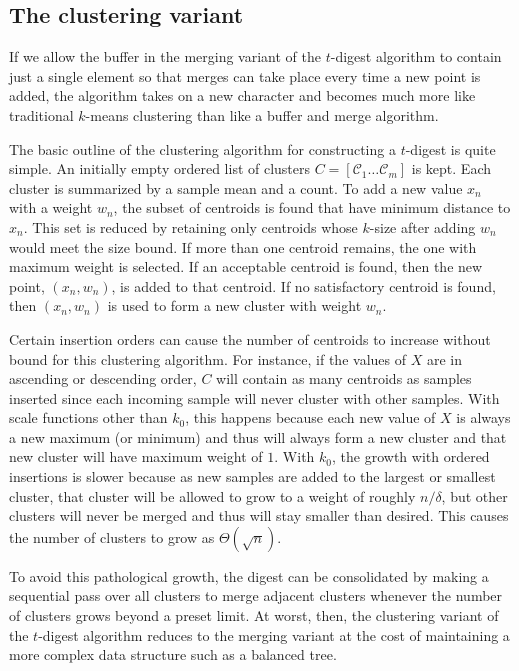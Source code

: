 \documentclass{vldb}
\begin{document}
\subsection{The clustering variant}
If we allow the buffer in the merging variant of the $t$-digest algorithm to contain just a single element so that merges can take place every time a new point is added, the algorithm takes on a new character and becomes much more like traditional $k$-means clustering than like a buffer and merge algorithm.

The basic outline of the clustering algorithm for constructing a $t$-digest is quite simple.  An initially empty ordered list of clusters $C = [ \mathcal C_1 \ldots \mathcal C_m ]$ is kept.  Each cluster is summarized by a sample mean and a count.  To add a new value $x_n$ with a weight $w_n$, the subset of centroids is found that have minimum distance to $x_n$.  This set is reduced by retaining only centroids whose $k$-size after adding $w_n$ would meet the size bound.  If more than one centroid remains, the one with maximum weight is selected.  If an acceptable centroid is found, then the new point, $(x_n,w_n)$, is added to that centroid. If no satisfactory centroid is found, then $(x_n,w_n)$ is used to form a new cluster with weight $w_n$.

Certain insertion orders can cause the number of centroids to increase without bound for this clustering algorithm. For instance, if the values of $X$ are in ascending or descending order, $C$ will contain as many centroids as samples inserted since each incoming sample will never cluster with other samples.  With scale functions other than $k_0$, this happens because each new value of $X$ is always a new maximum (or minimum) and thus will always form a new cluster and that new cluster will have maximum weight of $1$.  With $k_0$, the growth with ordered insertions is slower because as new samples are added to the largest or smallest cluster, that cluster will be allowed to grow to a weight of roughly $n/\delta$, but other clusters will never be merged and thus will stay smaller than desired. This causes the number of clusters to grow as $\Theta(\sqrt n )$. 

To avoid this pathological growth, the digest can be consolidated by making a sequential pass over all clusters to merge adjacent clusters whenever the number of clusters grows beyond a preset limit. At worst, then, the clustering variant of the $t$-digest algorithm reduces to the merging variant at the cost of maintaining a more complex data structure such as a balanced tree.
\end{document}
